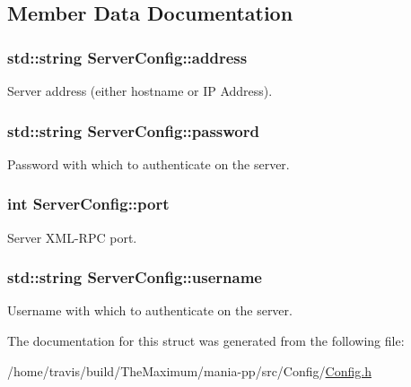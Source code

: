 \subsection{Member Data Documentation}
\hypertarget{structServerConfig_a2a4201c0c868ba962a57d75b07ddafaf}{
\subsubsection[{address}]{\setlength{\rightskip}{0pt plus 5cm}std\-::string Server\-Config\-::address}}\label{structServerConfig_a2a4201c0c868ba962a57d75b07ddafaf}


Server address (either hostname or I\-P Address). 

\hypertarget{structServerConfig_a819f5b912feb1fdb68ebd4fe36eb11ea}{
\subsubsection[{password}]{\setlength{\rightskip}{0pt plus 5cm}std\-::string Server\-Config\-::password}}\label{structServerConfig_a819f5b912feb1fdb68ebd4fe36eb11ea}


Password with which to authenticate on the server. 

\hypertarget{structServerConfig_ae459946703124ef5a1d98dba38a8b493}{
\subsubsection[{port}]{\setlength{\rightskip}{0pt plus 5cm}int Server\-Config\-::port}}\label{structServerConfig_ae459946703124ef5a1d98dba38a8b493}


Server X\-M\-L-\/\-R\-P\-C port. 

\hypertarget{structServerConfig_ad2216f13f13acbe6bfd61f275bc72e27}{
\subsubsection[{username}]{\setlength{\rightskip}{0pt plus 5cm}std\-::string Server\-Config\-::username}}\label{structServerConfig_ad2216f13f13acbe6bfd61f275bc72e27}


Username with which to authenticate on the server. 



The documentation for this struct was generated from the following file\-:\begin{DoxyCompactItemize}
\item 
/home/travis/build/\-The\-Maximum/mania-\/pp/src/\-Config/\hyperlink{Config_8h}{Config.\-h}\end{DoxyCompactItemize}
